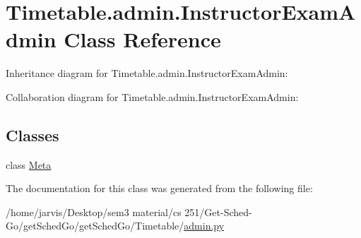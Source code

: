 \hypertarget{classTimetable_1_1admin_1_1InstructorExamAdmin}{}\section{Timetable.\+admin.\+Instructor\+Exam\+Admin Class Reference}
\label{classTimetable_1_1admin_1_1InstructorExamAdmin}


Inheritance diagram for Timetable.\+admin.\+Instructor\+Exam\+Admin\+:


Collaboration diagram for Timetable.\+admin.\+Instructor\+Exam\+Admin\+:
\subsection*{Classes}
\begin{DoxyCompactItemize}
\item 
class \hyperlink{classTimetable_1_1admin_1_1InstructorExamAdmin_1_1Meta}{Meta}
\end{DoxyCompactItemize}


The documentation for this class was generated from the following file\+:\begin{DoxyCompactItemize}
\item 
/home/jarvis/\+Desktop/sem3 material/cs 251/\+Get-\/\+Sched-\/\+Go/get\+Sched\+Go/get\+Sched\+Go/\+Timetable/\hyperlink{Timetable_2admin_8py}{admin.\+py}\end{DoxyCompactItemize}
